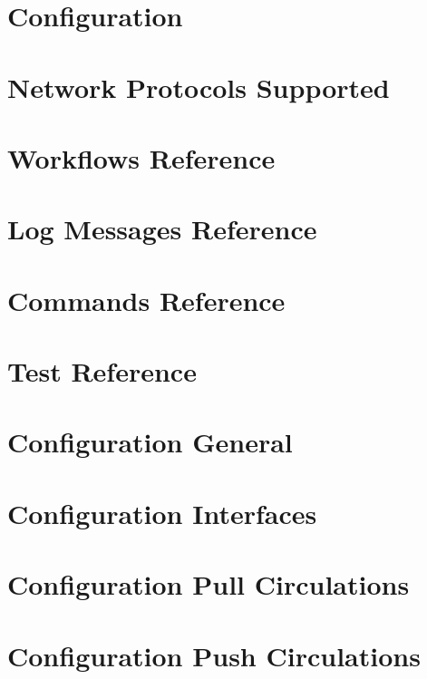 \documentclass[
	oneside,
	openany,
	a4paper,
	headings=optiontoheadandtoc
	]{book}
\begin{document}
\chapter{Configuration}


\chapter{Network Protocols Supported}


\chapter{Workflows Reference}


\chapter{Log Messages Reference}


\chapter{Commands Reference}


\chapter{Test Reference}


\appendix

\chapter{Configuration General}
 

\chapter{Configuration Interfaces}
 

\chapter{Configuration Pull Circulations}
 

\chapter{Configuration Push Circulations}
 
\end{document}
